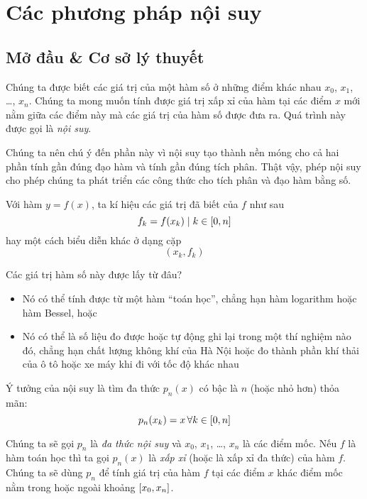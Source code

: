 \documentclass[../../Lectures]{subfiles}
\begin{document}
\chapter{Các phương pháp nội suy}



\section{Mở đầu \& Cơ sở lý thuyết}

Chúng ta được biết các giá trị của một hàm số ở những điểm khác nhau \(x_0\),
\(x_1\), \ldots, \(x_n\). Chúng ta mong muốn tính được giá trị xấp xỉ của hàm
tại các điểm \(x\) mới nằm giữa các điểm này mà các giá trị của hàm số được đưa
ra. Quá trình này được gọi là \emph{nội suy}.

Chúng ta nên chú ý đến phần này vì nội suy tạo thành nền móng cho cả hai phần
tính gần đúng đạo hàm và tính gần đúng tích phân. Thật vậy, phép nội suy cho
phép chúng ta phát triển các công thức cho tích phân và đạo hàm bằng số.

Với hàm \(y = f(x)\), ta kí hiệu các giá trị đã biết của \(f\) như sau
\[f_k = f(x_k) \mid k \in \interval{0}{n}\]
hay một cách biểu diễn khác ở dạng cặp
\[(x_k, f_k)\]

Các giá trị hàm số này được lấy từ đâu?
\begin{itemize}
    \item Nó có thể tính được từ một hàm ``toán học'', chẳng hạn hàm logarithm
        hoặc hàm Bessel, hoặc
    \item Nó có thể là số liệu đo được hoặc tự động ghi lại trong một thí nghiệm
        nào đó, chẳng hạn chất lượng không khí của Hà Nội hoặc đo thành phần khí
        thải của ô tô hoặc xe máy khi đi với tốc độ khác nhau
\end{itemize}

Ý tưởng của nội suy là tìm đa thức \(p_n(x)\) có bậc là \(n\) (hoặc nhỏ hơn) thỏa
mãn:
\begin{equation}\label{eq:general_approximation_polynomial}
    p_n(x_k) = x \, \forall k \in \interval{0}{n}
\end{equation}

Chúng ta sẽ gọi \(p_n\) là \emph{đa thức nội suy} và \(x_0\), \(x_1\), \ldots,
\(x_n\) là các điểm mốc. Nếu \(f\) là hàm toán học thì ta gọi \(p_n(x)\) là
\emph{xấp xỉ} (hoặc là xấp xỉ đa thức) của hàm \(f\). Chúng ta sẽ dùng \(p_n\)
để tính giá trị của hàm \(f\) tại các điểm \(x\) khác điểm mốc nằm trong hoặc
ngoài khoảng \(\interval{x_0}{x_n}\).
\end{document}
